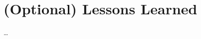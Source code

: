 
\chapter{(Optional) Lessons Learned} %



\ifpdf
    \graphicspath{{7_lessonslearned/figures/PNG/}{7_lessonslearned/figures/PDF/}{7_lessonslearned/figures/}}
\else
    \graphicspath{{7_lessonslearned/figures/EPS/}{7_lessonslearned/figures/}}
\fi


% 

\dots



